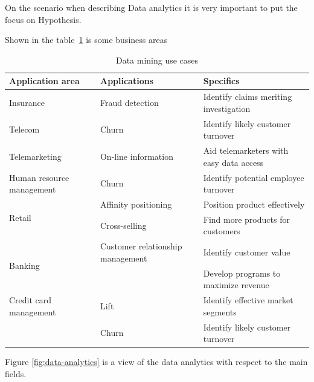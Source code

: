 On the scenario when describing Data analytics it is very important to put the focus on Hypothesis.

Shown in the table~\ref{tableDMusecase} is some business areas 


\begin{table}[H]
	\centering
	\begin{tabular}{|p{4cm}|p{4cm}|l|}
		\hline
		\textbf{Application area} & \textbf{Applications} & \textbf{Specifics}\\
		\hline
		Insurance & Fraud detection & Identify claims meriting investigation\\
		\hline
		Telecom & Churn & Identify likely customer turnover\\
		\hline
		Telemarketing & On-line information & Aid telemarketers with easy data access\\
		\hline
		Human resource management & Churn & Identify potential employee turnover\\
		\hline
		\multirow{2}{4em}{Retail}  & Affinity positioning & Position product effectively\\
		& Cross-selling & Find more products for customers\\
		\hline
		\multirow{2}{4em}{Banking} & Customer relationship management & Identify customer value\\
		&& Develop programs to maximize revenue\\
		\hline
		Credit card management & Lift & Identify effective market segments\\
		& Churn & Identify likely customer turnover\\
		\hline
	\end{tabular}
	\caption{Data mining use cases}
	\label{tableDMusecase}
\end{table}
	
Figure \ref{fig:data-analytics} is a view of the data analytics with respect to the main fields.

